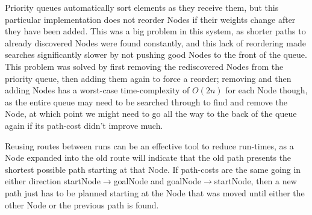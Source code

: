 Priority queues automatically sort elements as they receive them, but this particular implementation does not reorder Nodes if their weights change after they have been added. This was a big problem in this system, as shorter paths to already discovered Nodes were found constantly, and this lack of reordering made searches significantly slower by not pushing good Nodes to the front of the queue.\\
This problem was solved by first removing the rediscovered Nodes from the priority queue, then adding them again to force a reorder; removing and then adding Nodes has a worst-case time-complexity of $O(2n)$ for each Node though, as the entire queue may need to be searched through to find and remove the Node, at which point we might need to go all the way to the back of the queue again if its path-cost didn't improve much.

Reusing routes between runs can be an effective tool to reduce run-times, as a Node expanded into the old route will indicate that the old path presents the shortest possible path starting at that Node. If path-costs are the same going in either direction startNode$\to$goalNode and goalNode$\to$startNode, then a new path just has to be planned starting at the Node that was moved until either the other Node or the previous path is found.



 

